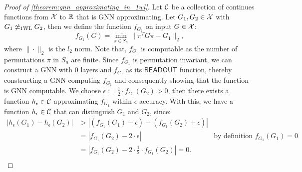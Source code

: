 \begin{proof}[Proof of \cref{theorem:gnn_approximating_in_1wl}]
    Let $\mathcal{C}$ be a collection of continues functions from $\mathcal{X}$ to $\mathbb{R}$ that is GNN approximating. Let $G_1, G_2 \in \mathcal{X}$ with $G_1 \not\simeq_{\text{1WL}} G_2$, then we define the function $f_{G_1}$ on input $G \in \mathcal{X}$:
    \begin{equation*}
         f_{G_1}(G) = \min_{\pi \in S_n} \|\pi^T G \pi - G_1\|_2,
    \end{equation*} where $\|\cdot\|_2$ is the $l_2$ norm. Note that, $f_{G_1}$ is computable as the number of permutations $\pi$ in $S_n$ are finite. Since $f_{G_1}$ is permutation invariant, we can construct a GNN with $0$ layers and $f_{G_1}$ as its $\textsf{READOUT}$ function, thereby constructing a GNN computing $f_{G_1}$ and consequently showing that the function is GNN computable.
    We choose $\epsilon := \frac{1}{2} \cdot f_{G_1}(G_2) > 0$, then there exists a function $h_\epsilon \in \mathcal{C}$ approximating $f_{G_1}$ within $\epsilon$ accuracy. With this, we have a function $h_\epsilon \in \mathcal{C}$ that can distinguish $G_1$ and $G_2$, since:
    \begin{align*}
        | h_\epsilon(G_1) - h_\epsilon(G_2)| &> | (f_{G_1}(G_1) - \epsilon) - (f_{G_1}(G_2) + \epsilon)|\\
        &= |f_{G_1}(G_2) -2 \cdot \epsilon| \quad&\text{by definition $f_{G_1}(G_1) = 0$}\\
        &= |f_{G_1}(G_2) -2 \cdot \frac{1}{2} \cdot f_{G_1}(G_2)| = 0.\\
    \end{align*}
\end{proof}


\newpage